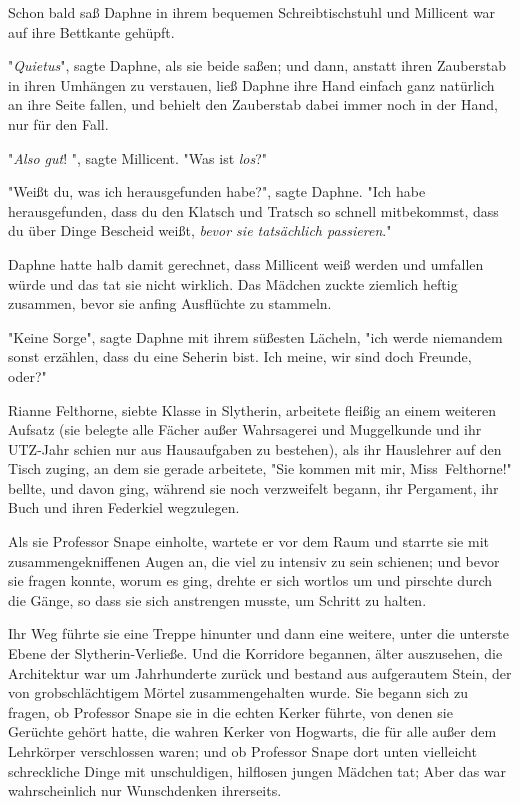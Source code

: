 {Schon bald saß Daphne in ihrem bequemen Schreibtischstuhl und Millicent war auf ihre Bettkante gehüpft.

"\emph{Quietus}", sagte Daphne, als sie beide saßen; und dann, anstatt ihren Zauberstab in ihren Umhängen zu verstauen, ließ Daphne ihre Hand einfach ganz natürlich an ihre Seite fallen, und behielt den Zauberstab dabei immer noch in der Hand, nur für den Fall.

"\emph{Also gut}! ", sagte Millicent. "Was ist \emph{los}?"

"Weißt du, was ich herausgefunden habe?", sagte Daphne. "Ich habe herausgefunden, dass du den Klatsch und Tratsch so schnell mitbekommst, dass du über Dinge Bescheid weißt, \emph{bevor sie tatsächlich passieren}."

Daphne hatte halb damit gerechnet, dass Millicent weiß werden und umfallen würde und das tat sie nicht wirklich. Das Mädchen zuckte ziemlich heftig zusammen, bevor sie anfing Ausflüchte zu stammeln.

"Keine Sorge", sagte Daphne mit ihrem süßesten Lächeln, "ich werde niemandem sonst erzählen, dass du eine Seherin bist. Ich meine, wir sind doch Freunde, oder?"

Rianne Felthorne, siebte Klasse in Slytherin, arbeitete fleißig an einem weiteren Aufsatz (sie belegte alle Fächer außer Wahrsagerei und Muggelkunde und ihr UTZ-Jahr schien nur aus Hausaufgaben zu bestehen), als ihr Hauslehrer auf den Tisch zuging, an dem sie gerade arbeitete, "Sie kommen mit mir, Miss~Felthorne!" bellte, und davon ging, während sie noch verzweifelt begann, ihr Pergament, ihr Buch und ihren Federkiel wegzulegen.

Als sie Professor Snape einholte, wartete er vor dem Raum und starrte sie mit zusammengekniffenen Augen an, die viel zu intensiv zu sein schienen; und bevor sie fragen konnte, worum es ging, drehte er sich wortlos um und pirschte durch die Gänge, so dass sie sich anstrengen musste, um Schritt zu halten.

Ihr Weg führte sie eine Treppe hinunter und dann eine weitere, unter die unterste Ebene der Slytherin-Verließe. Und die Korridore begannen, älter auszusehen, die Architektur war um Jahrhunderte zurück und bestand aus aufgerautem Stein, der von grobschlächtigem Mörtel zusammengehalten wurde. Sie begann sich zu fragen, ob Professor Snape sie in die echten Kerker führte, von denen sie Gerüchte gehört hatte, die wahren Kerker von Hogwarts, die für alle außer dem Lehrkörper verschlossen waren; und ob Professor Snape dort unten vielleicht schreckliche Dinge mit unschuldigen, hilflosen jungen Mädchen tat; Aber das war wahrscheinlich nur Wunschdenken ihrerseits.

}
